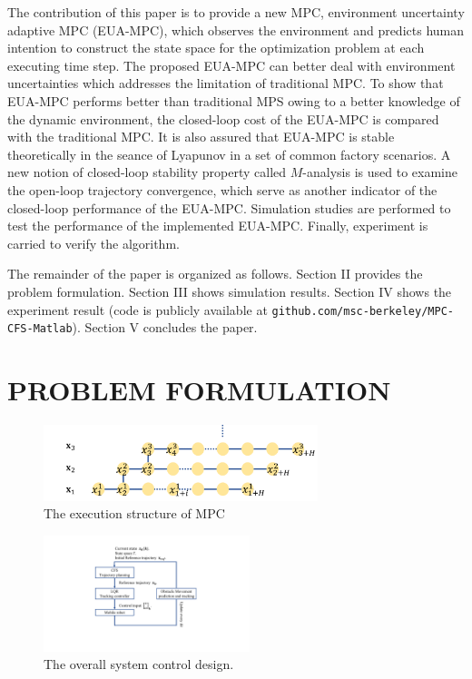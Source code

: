 \documentclass[letterpaper, 10 pt, conference]{ieeeconf}  %
\begin{document}
The contribution of this paper is to provide a new MPC, environment uncertainty adaptive MPC (EUA-MPC), which observes the environment and predicts human intention to construct the state space for the optimization problem at each executing time step. The proposed EUA-MPC can better deal with environment uncertainties which addresses the limitation of traditional MPC. To show that EUA-MPC performs better than traditional MPS owing to a better knowledge of the dynamic environment, the closed-loop cost of the EUA-MPC is compared with the traditional MPC. It is also assured that EUA-MPC is stable theoretically in the seance of Lyapunov in a set of common factory scenarios. A new notion of closed-loop stability property called $M$-analysis  \cite{jess2018mstable} is used to examine the open-loop trajectory convergence, which serve as another indicator of the closed-loop performance of the EUA-MPC. Simulation studies are performed to test the performance of the implemented EUA-MPC. Finally, experiment is carried to verify the algorithm.

The remainder of the paper is organized as follows. Section II provides the problem formulation. Section III shows simulation results. Section IV shows the experiment result (code is publicly available at {\tt\small github.com/msc-berkeley/MPC-CFS-Matlab}). Section V concludes the paper.

\section{PROBLEM FORMULATION}

\begin{figure}[t]
\begin{center}
\includegraphics[width=8cm]{src/MPCstruc.png}
\caption{The execution structure of MPC}
\label{fig: mpc}
\end{center}
\end{figure}

\begin{figure}[t]
      \centering
      \includegraphics[width=6cm]{plot/system.pdf}
      \caption{The overall system control design. }
      \label{fig:MPCsystem}
\end{figure}
\end{document}
